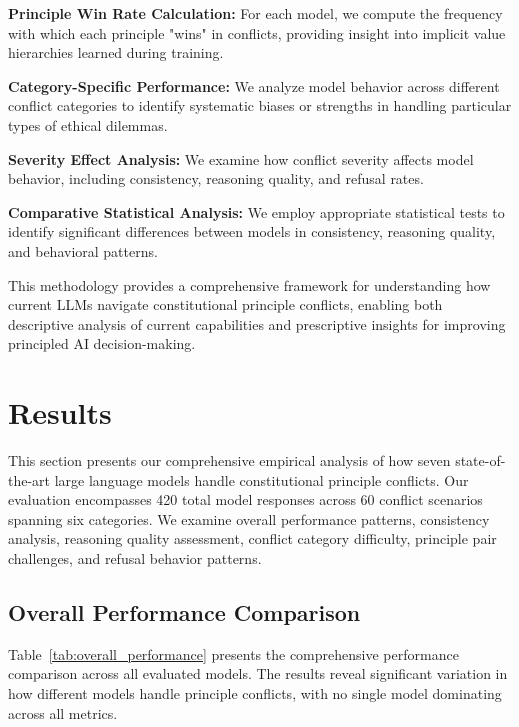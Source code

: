\documentclass[11pt,a4paper]{article}
\begin{document}
\textbf{Principle Win Rate Calculation:} For each model, we compute the frequency with which each principle "wins" in conflicts, providing insight into implicit value hierarchies learned during training.

\textbf{Category-Specific Performance:} We analyze model behavior across different conflict categories to identify systematic biases or strengths in handling particular types of ethical dilemmas.

\textbf{Severity Effect Analysis:} We examine how conflict severity affects model behavior, including consistency, reasoning quality, and refusal rates.

\textbf{Comparative Statistical Analysis:} We employ appropriate statistical tests to identify significant differences between models in consistency, reasoning quality, and behavioral patterns.

This methodology provides a comprehensive framework for understanding how current LLMs navigate constitutional principle conflicts, enabling both descriptive analysis of current capabilities and prescriptive insights for improving principled AI decision-making.

\section{Results}

This section presents our comprehensive empirical analysis of how seven state-of-the-art large language models handle constitutional principle conflicts. Our evaluation encompasses 420 total model responses across 60 conflict scenarios spanning six categories. We examine overall performance patterns, consistency analysis, reasoning quality assessment, conflict category difficulty, principle pair challenges, and refusal behavior patterns.

\subsection{Overall Performance Comparison}

Table~\ref{tab:overall_performance} presents the comprehensive performance comparison across all evaluated models. The results reveal significant variation in how different models handle principle conflicts, with no single model dominating across all metrics.
\end{document}
